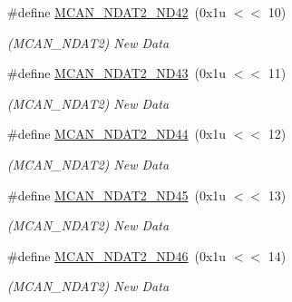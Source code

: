 \begin{DoxyCompactItemize}
\mbox{\label{group__SAMV71__MCAN_gab68ca5587ce9dd487303b1bb994073fb}} 
\#define \mbox{\hyperlink{group__SAMV71__MCAN_gab68ca5587ce9dd487303b1bb994073fb}{M\+C\+A\+N\+\_\+\+N\+D\+A\+T2\+\_\+\+N\+D42}}~(0x1u $<$$<$ 10)
\begin{DoxyCompactList}\small\item\em (M\+C\+A\+N\+\_\+\+N\+D\+A\+T2) New Data \end{DoxyCompactList}\item 
\mbox{\label{group__SAMV71__MCAN_gae6c83397c6bed34ca5a7015391bdbde4}} 
\#define \mbox{\hyperlink{group__SAMV71__MCAN_gae6c83397c6bed34ca5a7015391bdbde4}{M\+C\+A\+N\+\_\+\+N\+D\+A\+T2\+\_\+\+N\+D43}}~(0x1u $<$$<$ 11)
\begin{DoxyCompactList}\small\item\em (M\+C\+A\+N\+\_\+\+N\+D\+A\+T2) New Data \end{DoxyCompactList}\item 
\mbox{\label{group__SAMV71__MCAN_gad2b3063d02fad825c38e697531fc4cd4}} 
\#define \mbox{\hyperlink{group__SAMV71__MCAN_gad2b3063d02fad825c38e697531fc4cd4}{M\+C\+A\+N\+\_\+\+N\+D\+A\+T2\+\_\+\+N\+D44}}~(0x1u $<$$<$ 12)
\begin{DoxyCompactList}\small\item\em (M\+C\+A\+N\+\_\+\+N\+D\+A\+T2) New Data \end{DoxyCompactList}\item 
\mbox{\label{group__SAMV71__MCAN_gae13c0e7d2ff60cf79f2a11e2f511c303}} 
\#define \mbox{\hyperlink{group__SAMV71__MCAN_gae13c0e7d2ff60cf79f2a11e2f511c303}{M\+C\+A\+N\+\_\+\+N\+D\+A\+T2\+\_\+\+N\+D45}}~(0x1u $<$$<$ 13)
\begin{DoxyCompactList}\small\item\em (M\+C\+A\+N\+\_\+\+N\+D\+A\+T2) New Data \end{DoxyCompactList}\item 
\mbox{\label{group__SAMV71__MCAN_ga9e3c8266472b70c790073ad17f9bb62c}} 
\#define \mbox{\hyperlink{group__SAMV71__MCAN_ga9e3c8266472b70c790073ad17f9bb62c}{M\+C\+A\+N\+\_\+\+N\+D\+A\+T2\+\_\+\+N\+D46}}~(0x1u $<$$<$ 14)
\begin{DoxyCompactList}\small\item\em (M\+C\+A\+N\+\_\+\+N\+D\+A\+T2) New Data \end{DoxyCompactList}\item 
$$
\end{DoxyCompactItemize}
